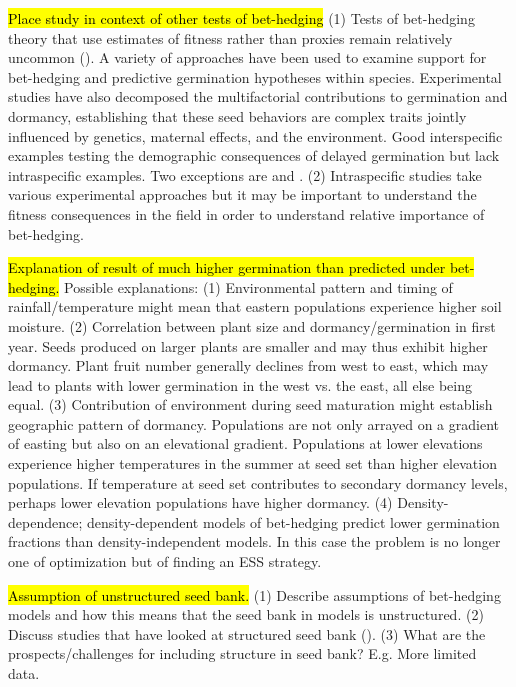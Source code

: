 \documentclass[12pt, oneside, titlepage]{article}   	%
\begin{document}
\hl{Place study in context of other tests of bet-hedging} (1) Tests of bet-hedging theory that use estimates of fitness rather than proxies remain relatively uncommon (\cite{simons2011}). A variety of approaches have been used to examine support for bet-hedging and predictive germination hypotheses within species. Experimental studies have also decomposed the multifactorial contributions to germination and dormancy, establishing that these seed behaviors are complex traits jointly influenced by genetics, maternal effects, and the environment. Good interspecific examples testing the demographic consequences of delayed germination but lack intraspecific examples. Two exceptions are \cite{clauss199a} and \cite{evans2007}. (2) Intraspecific studies take various experimental approaches but it may be important to understand the fitness consequences in the field in order to understand relative importance of bet-hedging. 

\hl{Explanation of result of much higher germination than predicted under bet-hedging.} Possible explanations: (1) Environmental pattern and timing of rainfall/temperature might mean that eastern populations experience higher soil moisture. (2) Correlation between plant size and dormancy/germination in first year. Seeds produced on larger plants are smaller and may thus exhibit higher dormancy. Plant fruit number generally declines from west to east, which may lead to plants with lower germination in the west vs. the east, all else being equal. (3) Contribution of environment during seed maturation might establish geographic pattern of dormancy. Populations are not only arrayed on a gradient of easting but also on an elevational gradient. Populations at lower elevations experience higher temperatures in the summer at seed set than higher elevation populations. If temperature at seed set contributes to secondary dormancy levels, perhaps lower elevation populations have higher dormancy. (4) Density-dependence; density-dependent models of bet-hedging predict lower germination fractions than density-independent models. In this case the problem is no longer one of optimization but of finding an ESS strategy.

\hl{Assumption of unstructured seed bank.} (1) Describe assumptions of bet-hedging models and how this means that the seed bank in models is unstructured. (2) Discuss studies that have looked at structured seed bank (\cite{philippi1993a}). (3) What are the prospects/challenges for including structure in seed bank? E.g. More limited data.
\end{document}
